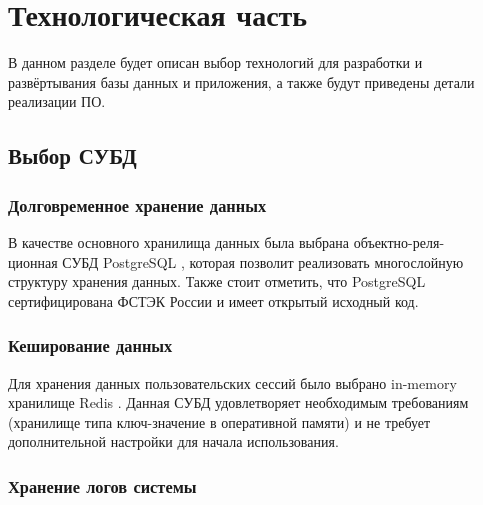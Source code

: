 \section{Технологическая часть}

В данном разделе будет описан выбор технологий для разработки и развёртывания базы данных и приложения, а также будут приведены детали реализации ПО.

\subsection{Выбор СУБД}


\subsubsection{Долговременное хранение данных}

В качестве основного хранилища данных была выбрана объектно-реля-\\ционная СУБД PostgreSQL \cite{PostgreSQL}, которая позволит реализовать многослойную структуру хранения данных. Также стоит отметить, что PostgreSQL сертифицирована ФСТЭК России \cite{fstec} и имеет открытый исходный код.


\subsubsection{Кеширование данных}

Для хранения данных пользовательских сессий было выбрано in-memory хранилище Redis \cite{Redis}. Данная СУБД удовлетворяет необходимым требованиям (хранилище типа ключ-значение в оперативной памяти) и не требует дополнительной настройки для начала использования.

\subsubsection{Хранение логов системы}

